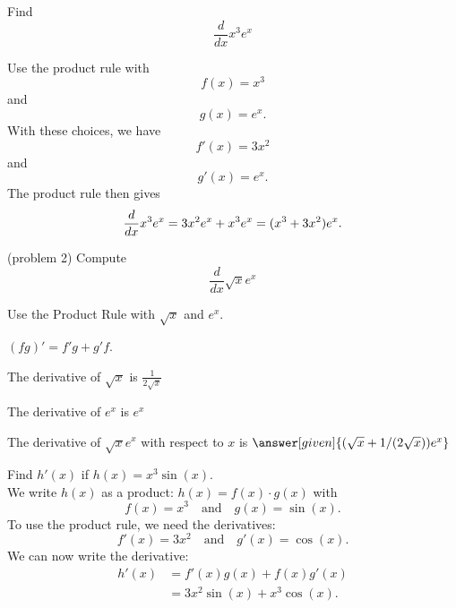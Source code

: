 \documentclass{ximera}
\begin{document}
\begin{example}[example 2]
Find 
\[
\frac{d}{dx} x^3e^x
\]

Use the product rule with 
\[
f(x) = x^3
\]
and
\[
g(x) = e^x.
\]
With these choices, we have
\[
f'(x) = 3x^2
\]
and 
\[
g'(x) = e^x.
\]
The product rule then gives
\[
\frac{d}{dx}x^3e^x = 3x^2e^x + x^3e^x\\
=(x^3 + 3x^2)e^x.
\]
\end{example}

\begin{problem}(problem 2)
  Compute
  \[
  \frac{d}{dx} \sqrt x e^x
  \]
  
    \begin{hint}
      Use the Product Rule with $\sqrt x$ and $e^x$.
    \end{hint}
    \begin{hint}
      $(fg)' = f'g+g'f$.
    \end{hint}
    \begin{hint}
      The derivative of $\sqrt x$ is $\frac{1}{2\sqrt x}$
    \end{hint}
    \begin{hint}
      The derivative of $e^x$ is $e^x$
    \end{hint}
    
		The derivative of $\sqrt x e^x$ with respect to $x$ is
		 $\answer[given]{(\sqrt x + 1/(2\sqrt x))e^x}$
		
\end{problem}




\begin{example}[example 3]
Find $h'(x)$ if $h(x) = x^3\sin(x)$.\\
We write $h(x)$ as a product: $h(x) = f(x)\cdot g(x)$ with 
\[f(x) = x^3 \quad \text{and} \quad g(x) = \sin(x).\]
To use the product rule, we need the derivatives:
\[f'(x) = 3x^2 \quad \text{and} \quad g'(x) = \cos(x).\]
We can now write the derivative:
\begin{align*}
h'(x) &= f'(x)g(x) + f(x)g'(x) \\
&= 3x^2\sin(x) + x^3\cos(x).
\end{align*}
\end{example}

\begin{center}
\begin{foldable}
\end{foldable}
\end{center}
\end{document}
